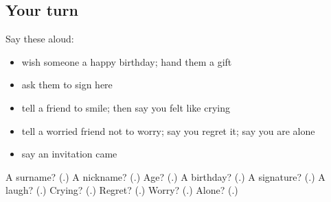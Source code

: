 \subsection*{Your turn}
Say these aloud:

\begin{itemize}
\raggedright
  \item wish someone a happy birthday; hand them a gift
  \item ask them to sign here
  \item tell a friend to smile; then say you felt like crying
  \item tell a worried friend not to worry; say you regret it; say you are alone
  \item say an invitation came
\end{itemize}

\begin{tcolorbox}[breakable,colback=teal!4,colframe=teal!35!black,title={Before you move on}]
A surname? (\textbf{}.) A nickname? (\textbf{}.) Age? (\textbf{}.) A birthday? (\textbf{}.) A signature? (\textbf{}.) A laugh? (\textbf{}.) Crying? (\textbf{}.) Regret? (\textbf{}.) Worry? (\textbf{}.) Alone? (\textbf{}.)
\end{tcolorbox}

